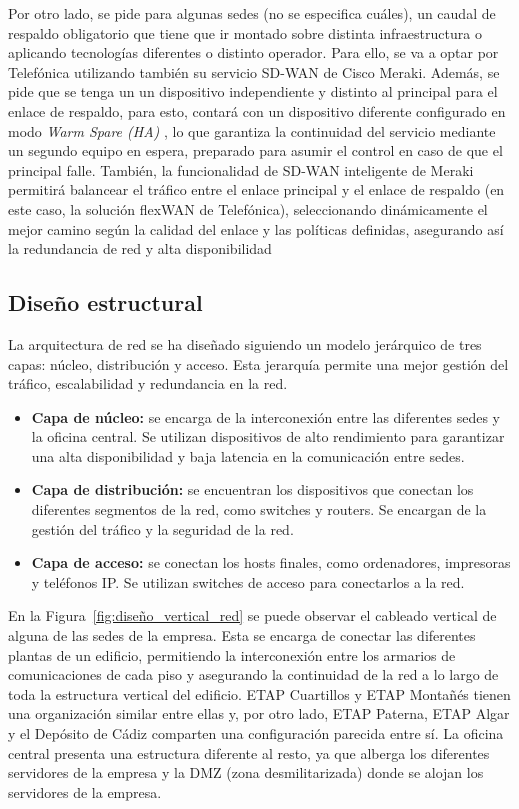 Por otro lado, se pide para algunas sedes (no se especifica cuáles), un caudal de respaldo obligatorio que tiene que ir montado sobre distinta infraestructura o aplicando tecnologías diferentes o distinto operador. Para ello, se va a optar por Telefónica utilizando también su servicio SD-WAN de Cisco Meraki. Además, se pide que se tenga un un dispositivo independiente y distinto al principal para el enlace de respaldo, para esto, contará con un dispositivo diferente configurado en modo \textit{Warm Spare (HA)} \cite{meraki_warm_spare}, lo que garantiza la continuidad del servicio mediante un segundo equipo en espera, preparado para asumir el control en caso de que el principal falle. También, la funcionalidad de SD-WAN inteligente de Meraki permitirá balancear el tráfico entre el enlace principal y el enlace de respaldo (en este caso, la solución flexWAN de Telefónica), seleccionando dinámicamente el mejor camino según la calidad del enlace y las políticas definidas, asegurando así la redundancia de red y alta disponibilidad

\subsection{Diseño estructural}
La arquitectura de red se ha diseñado siguiendo un modelo jerárquico de tres capas: núcleo, distribución y acceso. Esta jerarquía permite una mejor gestión del tráfico, escalabilidad y redundancia en la red.
\begin{itemize}
	\item \textbf{Capa de núcleo:} se encarga de la interconexión entre las diferentes sedes y la oficina central. Se utilizan dispositivos de alto rendimiento para garantizar una alta disponibilidad y baja latencia en la comunicación entre sedes.
	\item \textbf{Capa de distribución:} se encuentran los dispositivos que conectan los diferentes segmentos de la red, como switches y routers. Se encargan de la gestión del tráfico y la seguridad de la red.
	\item \textbf{Capa de acceso:} se conectan los hosts finales, como ordenadores, impresoras y teléfonos IP. Se utilizan switches de acceso para conectarlos a la red.
\end{itemize}

En la Figura~\ref{fig:diseño_vertical_red} se puede observar el cableado vertical de alguna de las sedes de la empresa.
Esta se encarga de conectar las diferentes plantas de un edificio, permitiendo la interconexión entre los armarios de comunicaciones de cada piso y asegurando la continuidad de la red a lo largo de toda la estructura vertical del edificio. ETAP Cuartillos y ETAP Montañés tienen una organización similar entre ellas y, por otro lado, ETAP Paterna, ETAP Algar y el Depósito de Cádiz comparten una configuración parecida entre sí. La oficina central presenta una estructura diferente al resto, ya que alberga los diferentes servidores de la empresa y la DMZ (zona desmilitarizada) donde se alojan los servidores de la empresa.


